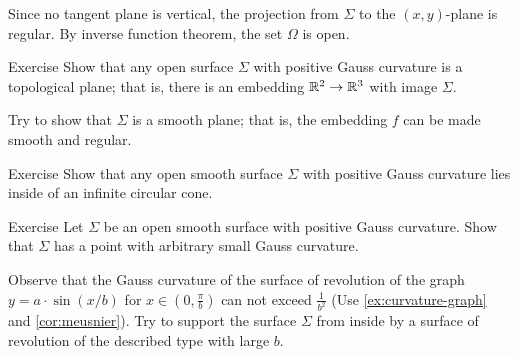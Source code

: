 Since no tangent plane is vertical, the projection from $\Sigma$ to the $(x,y)$-plane is regular.
By inverse function theorem, the set $\Omega$ is open.\qeds

\begin{thm}{Exercise}
Show that any open surface $\Sigma$ with positive Gauss curvature is a topological plane;
that is, there is an embedding $\mathbb{R}^2\to\mathbb{R}^3$ with image $\Sigma$.

Try to show that $\Sigma$ is a smooth plane; that is, the embedding $f$ can be made smooth and regular.
\end{thm}

\begin{thm}{Exercise}\label{ex:circular-cone}
Show that any open smooth surface $\Sigma$ with positive Gauss curvature
lies inside of an infinite circular cone. 
\end{thm}

\begin{thm}{Exercise}\label{ex:small-gauss}
Let $\Sigma$ be an open smooth surface with positive Gauss curvature.
Show that $\Sigma$ has a point with arbitrary small Gauss curvature.
\end{thm}

Observe that the Gauss curvature of the surface of revolution of the graph $y=a\cdot \sin (x/b)$ for $x\in(0,\tfrac\pi b)$ can not exceed $\tfrac{1}{b^2}$ (Use \ref{ex:curvature-graph} and \ref{cor:meusnier}).
Try to support the surface $\Sigma$ from inside by a surface of revolution of the described type with large $b$. 



 

